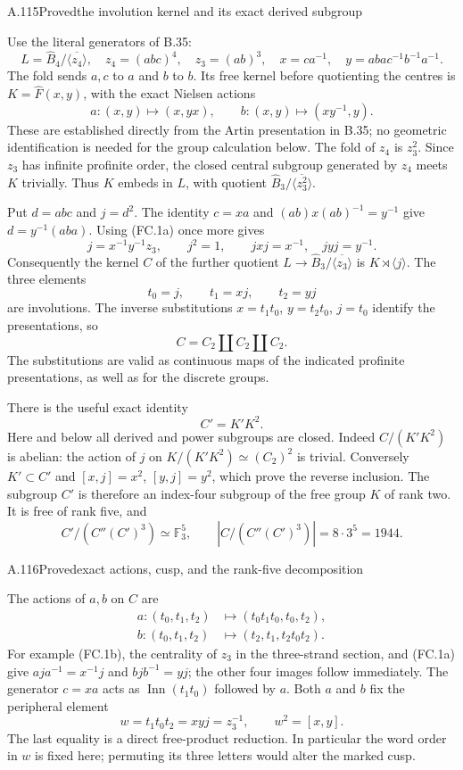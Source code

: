 \begin{statement}{A.115}{Proved}{the involution kernel and its exact derived subgroup}
\end{statement}
Use the literal generators of B.35:
\[
 L=\widehat B_4/\overline{\langle z_4\rangle},\quad
 z_4=(abc)^4,\quad z_3=(ab)^3,\quad
 x=ca^{-1},\quad y=aba c^{-1}b^{-1}a^{-1}.
\]
The fold sends $a,c$ to $a$ and $b$ to $b$. Its free kernel
before quotienting the centres is $K=\widehat F(x,y)$, with
the exact Nielsen actions
\[
 a:(x,y)\mapsto(x,yx),\qquad
 b:(x,y)\mapsto(xy^{-1},y).
 \tag{FC.1a}
\]
These are established directly from the Artin presentation in B.35;
no geometric identification is needed for the group calculation below.
The fold of $z_4$ is $z_3^2$. Since $z_3$ has infinite
profinite order, the closed central subgroup generated by $z_4$
meets $K$ trivially. Thus $K$ embeds in $L$, with quotient
$\widehat B_3/\overline{\langle z_3^2\rangle}$.

Put $d=abc$ and $j=d^2$. The identity $c=xa$ and
$(ab)x(ab)^{-1}=y^{-1}$ give $d=y^{-1}(aba)$.
Using (FC.1a) once more gives
\[
       j=x^{-1}y^{-1}z_3,\qquad
       j^2=1,\qquad jxj=x^{-1},\quad jyj=y^{-1}.
 \tag{FC.1b}
\]
Consequently the kernel $C$ of the further quotient
$L\to\widehat B_3/\overline{\langle z_3\rangle}$ is
$K\rtimes\langle j\rangle$. The three elements
\[
             t_0=j,\qquad t_1=xj,\qquad t_2=yj
\]
are involutions. The inverse substitutions
$x=t_1t_0$, $y=t_2t_0$, $j=t_0$ identify the presentations,
so
\[
              C=C_2\amalg C_2\amalg C_2.
 \tag{FC.1c}
\]
The substitutions are valid as continuous maps of the indicated
profinite presentations, as well as for the discrete groups.

There is the useful exact identity
\[
                    \boxed{\ C'=K'K^2.\ }
 \tag{FC.1d}
\]
Here and below all derived and power subgroups are closed.
Indeed $C/(K'K^2)$ is abelian: the action of $j$ on
$K/(K'K^2)\simeq(C_2)^2$ is trivial. Conversely $K'\subset C'$
and $[x,j]=x^2$, $[y,j]=y^2$, which prove the reverse inclusion.
The subgroup $C'$ is therefore an index-four subgroup of the
free group $K$ of rank two. It is free of rank five, and
\[
  C'/(C''(C')^3)\simeq\mathbb F_3^5,\qquad
  |C/(C''(C')^3)|=8\cdot3^5=1944.
 \tag{FC.1e}
\]

\begin{statement}{A.116}{Proved}{exact actions, cusp, and the rank-five decomposition}
\end{statement}
The actions of $a,b$ on $C$ are
\[
\begin{split}
 a:(t_0,t_1,t_2)&\mapsto(t_0t_1t_0,t_0,t_2),\\
 b:(t_0,t_1,t_2)&\mapsto(t_2,t_1,t_2t_0t_2).
\end{split}
 \tag{FC.2a}
\]
For example (FC.1b), the centrality of $z_3$ in the
three-strand section, and (FC.1a) give
$aja^{-1}=x^{-1}j$ and $bjb^{-1}=yj$; the other four
images follow immediately. The generator $c=xa$ acts as
$\operatorname{Inn}(t_1t_0)$ followed by $a$.
Both $a$ and $b$ fix the peripheral element
\[
 w=t_1t_0t_2=xyj=z_3^{-1},\qquad w^2=[x,y].
 \tag{FC.2b}
\]
The last equality is a direct free-product reduction. In particular
the word order in $w$ is fixed here; permuting its three letters
would alter the marked cusp.

